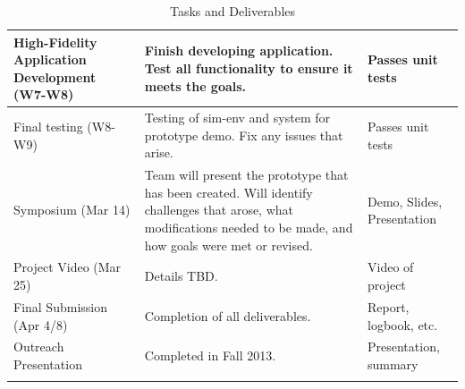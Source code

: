 \documentclass{article}
\begin{document}
\begin{longtable}{|p{4.5cm}|p{6cm}|p{4.5cm}|}
    High-Fidelity Application Development (W7-W8)     & Finish developing application. Test all functionality to ensure it meets the goals.                                                                                                                                                & Passes unit tests                     \\ \hline
    Final testing (W8-W9)                             & Testing of sim-env and system for prototype demo. Fix any issues that arise.                                                                                                                                                       & Passes unit tests                     \\ \hline
    Symposium (Mar 14)                                & Team will present the prototype that has been created. Will identify challenges that arose, what modifications needed to be made, and how goals were met or revised.                                                               & Demo, Slides, Presentation            \\ \hline
    Project Video (Mar 25)                            & Details TBD.                                                                                                                                                                                                                       & Video of project                      \\ \hline
    Final Submission (Apr 4/8)                        & Completion of all deliverables.                                                                                                                                                                                                    & Report, logbook, etc.                 \\ \hline
    Outreach Presentation                             & Completed in Fall 2013.                                                                                                                                                                                                            & Presentation, summary                 \\ \hline
\caption{Tasks and Deliverables}
\label{table:tasks-deliverables}
\end{longtable}

\newpage
\end{document}
